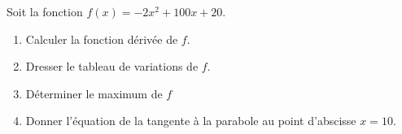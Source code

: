 
\begin{exercice}\label{exosmath-0398}

    Soit la fonction \( f(x)=-2x^2+100x+20\).
    \begin{enumerate}
        \item
            Calculer la fonction dérivée de \( f\).
        \item
            Dresser le tableau de variations de \( f\).
        \item
            Déterminer le maximum de \( f\)
        \item
            Donner l'équation de la tangente à la parabole au point d'abscisse \( x=10\).
    \end{enumerate}

\end{exercice}
